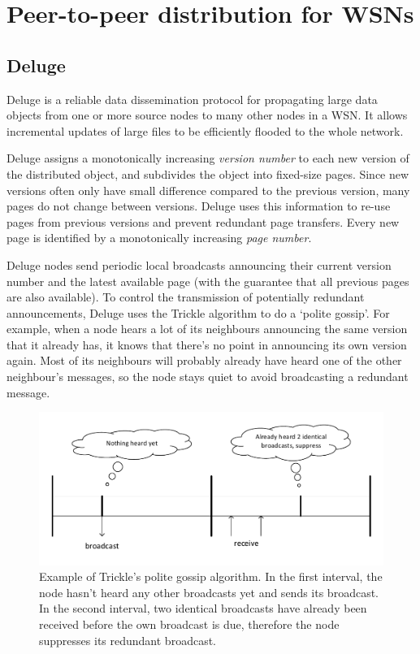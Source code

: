 \section{Peer-to-peer distribution for WSNs}
\label{sec:related:wsn}

\subsection{Deluge}
\label{sec:related:deluge}
Deluge \cite{deluge} is a reliable data dissemination protocol for propagating large data objects from one or more source nodes to many other nodes in a \gls{WSN}. It allows incremental updates of large files to be efficiently flooded to the whole network.

Deluge assigns a monotonically increasing \emph{version number} to each new version of the distributed object, and subdivides the object into fixed-size pages. Since new versions often only have small difference compared to the previous version, many pages do not change between versions. Deluge uses this information to re-use pages from previous versions and prevent redundant page transfers. Every new page is identified by a monotonically increasing \emph{page number}.

Deluge nodes send periodic local broadcasts announcing their current version number and the latest available page (with the guarantee that all previous pages are also available). To control the transmission of potentially redundant announcements, Deluge uses the Trickle algorithm \cite{trickle} to do a `polite gossip'. For example, when a node hears a lot of its neighbours announcing the same version that it already has, it knows that there's no point in announcing its own version again. Most of its neighbours will probably already have heard one of the other neighbour's messages, so the node stays quiet to avoid broadcasting a redundant message.

\begin{figure}
    \centering
    \includegraphics[width=\textwidth]{diagrams/trickle.pdf}
    \caption[Trickle algorithm example]{Example of Trickle's polite gossip algorithm. In the first interval, the node hasn't heard any other broadcasts yet and sends its broadcast. In the second interval, two identical broadcasts have already been received before the own broadcast is due, therefore the node suppresses its redundant broadcast.}
    \label{fig:related:trickle}
\end{figure}

